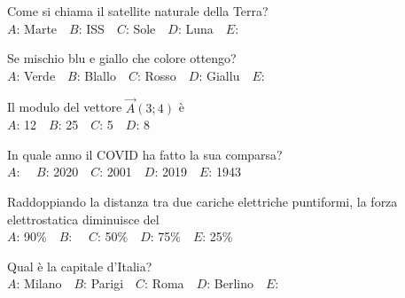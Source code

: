 \mcquestionfooter



\def\mcquestionnumber{9}


\mcquestionheader Come si chiama il satellite naturale della Terra?\\
{$A$}: Marte\ \ {$B$}: ISS\ \ {$C$}: Sole\ \ {$D$}: Luna\ \ {$E$}: \ \ 

\mcquestionfooter



\def\mcquestionnumber{10}


\mcquestionheader Se mischio blu e giallo che colore ottengo?\\
{$A$}: Verde\ \ {$B$}: Blallo\ \ {$C$}: Rosso\ \ {$D$}: Giallu\ \ {$E$}: \ \ 

\mcquestionfooter



\def\mcquestionnumber{11}


\mcquestionheader Il modulo del vettore $\vec{A}(3;4)$ è\\
{$A$}: 12\ \ {$B$}: 25\ \ {$C$}: 5\ \ {$D$}: 8\ \ 

\mcquestionfooter



\def\mcquestionnumber{12}


\mcquestionheader In quale anno il COVID ha fatto la sua comparsa?\\
{$A$}: \ \ {$B$}: 2020\ \ {$C$}: 2001\ \ {$D$}: 2019\ \ {$E$}: 1943\ \ 

\mcquestionfooter



\mcpaperfooter

\def\mcserialnumber{37}
\mcpaperheader


\def\mcquestionnumber{1}


\mcquestionheader Raddoppiando la distanza tra due cariche elettriche puntiformi, la forza elettrostatica diminuisce del\\
{$A$}: 90\%\ \ {$B$}: \ \ {$C$}: 50\%\ \ {$D$}: 75\%\ \ {$E$}: 25\%\ \ 

\mcquestionfooter



\def\mcquestionnumber{2}


\mcquestionheader Qual è la capitale d’Italia?\\
{$A$}: Milano\ \ {$B$}: Parigi\ \ {$C$}: Roma\ \ {$D$}: Berlino\ \ {$E$}: \ \ 

\mcquestionfooter



\def\mcquestionnumber{3}


